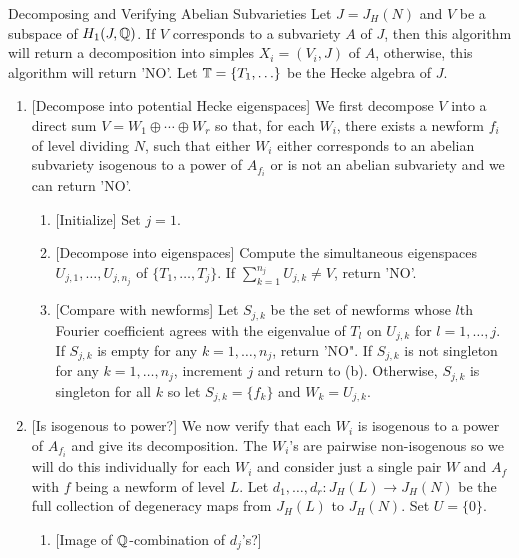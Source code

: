 \documentclass{article}
\begin{document}
\begin{algorithm}{Decomposing and Verifying Abelian Subvarieties}
	Let $J=J_H(N)$ and $V$ be a subspace of $H_1(J, \mathbb{Q})$. If $V$ corresponds
	to a subvariety $A$ of $J$, then this algorithm will return a decomposition
	into simples $X_i=(V_i, J)$ of $A$, otherwise, this algorithm will return
	'NO'. Let $\mathbb{T}=\{T_1,\ldots\}$ be the Hecke algebra of $J$.
	\begin{enumerate}
		\item{} [Decompose into potential Hecke eigenspaces]
		      We first decompose $V$ into a direct sum $V=W_1\oplus \cdots \oplus
			      W_r$ so that, for each $W_i$, there exists a newform $f_i$ of level
		      dividing $N$, such that either $W_i$ either corresponds to an
		      abelian subvariety isogenous to a power of $A_{f_i}$ or is not an
		      abelian subvariety and we can return 'NO'.
		      \begin{enumerate}
			      \item{} [Initialize]
			            Set $j=1$.
			      \item{} [Decompose into eigenspaces]
			            Compute the simultaneous eigenspaces $U_{j,1},\ldots,U_{j,
				            n_j}$ of $\{T_1,\ldots,T_j\}$. If $\sum_{k=1} ^{n_j}
				            U_{j, k}\neq V$, return 'NO'.
			      \item{} [Compare with newforms]
			            Let $S_{j,k}$ be the set of newforms whose $l$th Fourier
			            coefficient agrees with the eigenvalue of $T_l$ on $U_{j,
						            k}$ for $l=1,\ldots,j$. If $S_{j, k}$ is empty for any
			            $k=1,\ldots,n_j$, return 'NO". If $S_{j,k}$ is not
			            singleton for any $k=1,\ldots, n_j$, increment $j$ and
			            return to (b). Otherwise, $S_{j,k}$ is singleton for all
			            $k$ so let $S_{j,k}=\{f_k\}$ and $W_k=U_{j,k}$.
		      \end{enumerate}
		\item{} [Is isogenous to power?]
		      We now verify that each $W_i$ is isogenous to a power of $A_{f_i}$
		      and give its decomposition. The $W_i$'s are pairwise non-isogenous
		      so we will do this individually for each $W_i$ and consider just a
		      single pair $W$ and $A_f$ with $f$ being a newform of level $L$.
		      Let $d_1,\ldots,d_r:J_H(L)\to J_H(N)$ be the full collection of
		      degeneracy maps from $J_H(L)$ to $J_H(N)$.  Set $U=\{0\}$.
		      \begin{enumerate}
			      \item{} [Image of $\mathbb{Q}$-combination of $d_j$'s?]

\end{enumerate}
\end{enumerate}
\end{algorithm}
\end{document}
